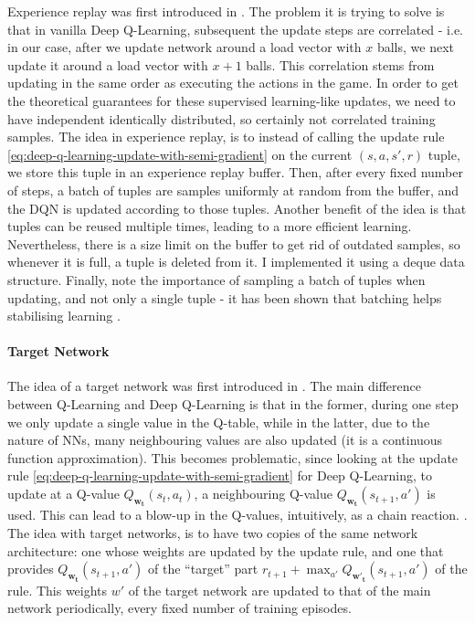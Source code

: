 Experience replay was first introduced in \cite{lin1992experiencereplay}. The problem it is trying to solve is that in vanilla Deep Q-Learning, subsequent the update steps are correlated - i.e. in our case, after we update network around a load vector with $x$ balls, we next update it around a load vector with $x+1$ balls. This correlation stems from updating in the same order as executing the actions in the game. In order to get the theoretical guarantees for these supervised learning-like updates, we need to have independent identically distributed, so certainly not correlated training samples. The idea in experience replay, is to instead of calling the update rule \ref{eq:deep-q-learning-update-with-semi-gradient} on the current $(s, a, s', r)$ tuple, we store this tuple in an experience replay buffer. Then, after every fixed number of steps, a batch of tuples are samples uniformly at random from the buffer, and the DQN is updated according to those tuples. Another benefit of the idea is that tuples can be reused multiple times, leading to a more efficient learning. Nevertheless, there is a size limit on the buffer to get rid of outdated samples, so whenever it is full, a tuple is deleted from it. I implemented it using a deque data structure. Finally, note the importance of sampling a batch of tuples when updating, and not only a single tuple - it has been shown that batching helps stabilising learning \cite{qian2020batchingsgd}.


\paragraph{Target Network}


The idea of a target network was first introduced in \cite{argueta1992targetnetwork}. The main difference between Q-Learning and Deep Q-Learning is that in the former, during one step we only update a single value in the Q-table, while in the latter, due to the nature of NNs, many neighbouring values are also updated (it is a continuous function approximation). This becomes problematic, since looking at the update rule \ref{eq:deep-q-learning-update-with-semi-gradient} for Deep Q-Learning, to update at a Q-value $Q_{\mathbf{w_t}}(s_t, a_t)$, a neighbouring Q-value $Q_{\mathbf{w_t}}(s_{t+1}, a')$ is used. This can lead to a blow-up in the Q-values, intuitively, as a chain reaction. . The idea with target networks, is to have two copies of the same network architecture: one whose weights are updated by the update rule, and one that provides $Q_{\mathbf{w_t}}(s_{t+1}, a')$ of the ``target'' part $r_{t+1}+ \max_{a'} Q_{\mathbf{w'_t}}(s_{t+1}, a')$ of the rule. This weights $w'$ of the target network are updated to that of the main network periodically, every fixed number of training episodes.


